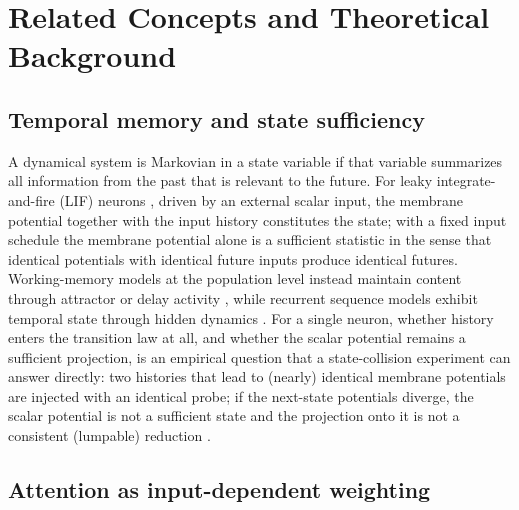 \section{Related Concepts and Theoretical Background}\label{sec:background}

\subsection{Temporal memory and state sufficiency}\label{sec:bkg-state}

A dynamical system is Markovian in a state variable if that variable
summarizes all information from the past that is relevant to the future.
For leaky integrate-and-fire (LIF) neurons
\citep{lapicque1907,abbott1999,burkitt2006}, driven by an external
scalar input, the membrane potential together with the input history
constitutes the state; with a fixed input schedule the membrane potential
alone is a sufficient statistic in the sense that identical potentials
with identical future inputs produce identical futures.  Working-memory
models at the population level instead maintain content through
attractor or delay activity \citep{goldmanrakic1995,durstewitz2000,
compte2000,hopfield1982}, while recurrent sequence models exhibit
temporal state through hidden dynamics \citep{elman1990,maass2002,
jaeger2001}.  For a single neuron, whether history enters the transition
law at all, and whether the scalar potential remains a sufficient
projection, is an empirical question that a state-collision experiment
can answer directly: two histories that lead to (nearly) identical
membrane potentials are injected with an identical probe; if the
next-state potentials diverge, the scalar potential is not a sufficient
state and the projection onto it is not a consistent (lumpable)
reduction \citep{kemeny1960}.

\subsection{Attention as input-dependent weighting}\label{sec:bkg-attn}

